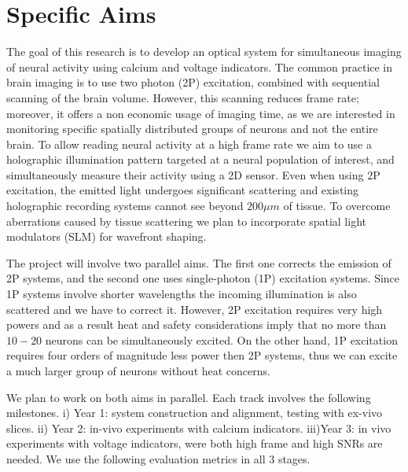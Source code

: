 \section*{Specific Aims}

The goal of this research is to develop an optical system for simultaneous imaging of neural activity using calcium and voltage indicators. 
The common practice in brain imaging is to use two photon (2P) excitation,  combined with sequential scanning of the brain volume. However, this scanning reduces frame rate; moreover, it offers  a non economic usage of imaging time, as we are  interested in monitoring specific spatially distributed groups of neurons and not the entire brain.
To allow reading neural activity at a high frame rate we aim to
use a holographic illumination pattern targeted at a neural population of interest, and simultaneously measure their activity using a 2D sensor. 
Even when using 2P excitation, the emitted light  undergoes significant scattering and existing  holographic recording systems cannot see beyond $200\mu m$ of tissue.
 To overcome aberrations caused by tissue scattering we plan to incorporate spatial light modulators (SLM) for wavefront shaping. 

The project will involve two parallel aims. The first one corrects the emission of 2P systems, and the second one uses single-photon (1P) excitation systems. Since 1P systems involve shorter wavelengths the incoming illumination is also scattered  and we  have to correct it. However, 2P excitation requires very high powers and as a result heat and safety considerations imply that no more than $10-20$ neurons can be simultaneously excited. 
On the other hand, 1P excitation requires four orders of magnitude less power then 2P systems, thus we can excite a much larger group of neurons without heat concerns.
	
We plan to work on both aims in parallel. Each track involves the following milestones. i) Year 1: system construction and alignment,  testing with ex-vivo   slices. ii) Year 2: in-vivo experiments with calcium indicators. iii)Year 3: in vivo experiments with voltage indicators, were both high frame and high SNRs are needed. We use the following evaluation metrics in all 3 stages.


